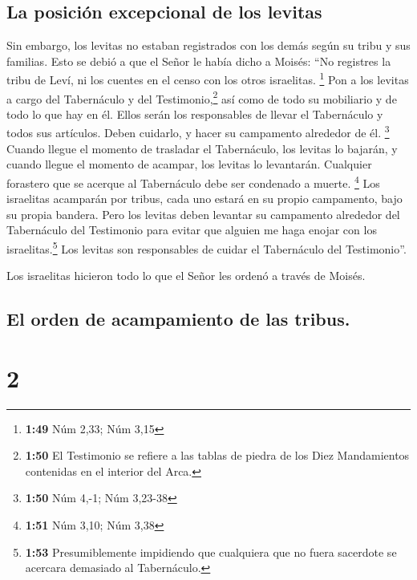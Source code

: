 \hypertarget{la-posiciuxf3n-excepcional-de-los-levitas}{%
\subsection{La posición excepcional de los
levitas}\label{la-posiciuxf3n-excepcional-de-los-levitas}}

 Sin embargo, los levitas no estaban registrados con los
demás según su tribu y sus familias.  Esto se debió a que
el Señor le había dicho a Moisés:  ``No registres la
tribu de Leví, ni los cuentes en el censo con los otros israelitas.
\footnote{\textbf{1:49} Núm 2,33; Núm 3,15}  Pon a los
levitas a cargo del Tabernáculo y del Testimonio,\footnote{\textbf{1:50}
  El Testimonio se refiere a las tablas de piedra de los Diez
  Mandamientos contenidas en el interior del Arca.} así como de todo su
mobiliario y de todo lo que hay en él. Ellos serán los responsables de
llevar el Tabernáculo y todos sus artículos. Deben cuidarlo, y hacer su
campamento alrededor de él. \footnote{\textbf{1:50} Núm 4,-1; Núm
  3,23-38}  Cuando llegue el momento de trasladar el
Tabernáculo, los levitas lo bajarán, y cuando llegue el momento de
acampar, los levitas lo levantarán. Cualquier forastero que se acerque
al Tabernáculo debe ser condenado a muerte. \footnote{\textbf{1:51} Núm
  3,10; Núm 3,38}  Los israelitas acamparán por tribus,
cada uno estará en su propio campamento, bajo su propia bandera.
 Pero los levitas deben levantar su campamento alrededor
del Tabernáculo del Testimonio para evitar que alguien me haga enojar
con los israelitas.\footnote{\textbf{1:53} Presumiblemente impidiendo
  que cualquiera que no fuera sacerdote se acercara demasiado al
  Tabernáculo.} Los levitas son responsables de cuidar el Tabernáculo
del Testimonio''.

 Los israelitas hicieron todo lo que el Señor les ordenó
a través de Moisés.

\hypertarget{el-orden-de-acampamiento-de-las-tribus.}{%
\subsection{El orden de acampamiento de las
tribus.}\label{el-orden-de-acampamiento-de-las-tribus.}}

\hypertarget{section-1}{%
\section{2}\label{section-1}}

